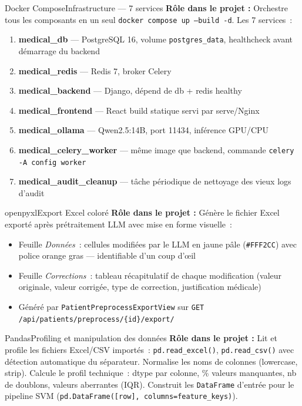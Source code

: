 \documentclass[12pt,a4paper]{article}
\begin{document}
\begin{toolbox}{Docker Compose}{Infrastructure --- 7 services}
\textbf{Rôle dans le projet :} Orchestre tous les composants en un seul
\texttt{docker compose up --build -d}. Les 7 services~:
\begin{enumerate}[leftmargin=2em, itemsep=1pt]
  \item \textbf{medical\_db} --- PostgreSQL 16, volume \texttt{postgres\_data},
    healthcheck avant démarrage du backend
  \item \textbf{medical\_redis} --- Redis 7, broker Celery
  \item \textbf{medical\_backend} --- Django, dépend de db + redis healthy
  \item \textbf{medical\_frontend} --- React build statique servi par serve/Nginx
  \item \textbf{medical\_ollama} --- Qwen2.5:14B, port 11434, inférence GPU/CPU
  \item \textbf{medical\_celery\_worker} --- même image que backend, commande
    \texttt{celery -A config worker}
  \item \textbf{medical\_audit\_cleanup} --- tâche périodique de nettoyage des
    vieux logs d'audit
\end{enumerate}
\end{toolbox}

\begin{toolbox}{openpyxl}{Export Excel coloré}
\textbf{Rôle dans le projet :} Génère le fichier Excel exporté après prétraitement
LLM avec mise en forme visuelle~:
\begin{itemize}[leftmargin=1.5em, itemsep=2pt]
  \item Feuille \textit{Données}~: cellules modifiées par le LLM en jaune pâle
    (\texttt{\#FFF2CC}) avec police orange gras --- identifiable d'un coup d'œil
  \item Feuille \textit{Corrections}~: tableau récapitulatif de chaque modification
    (valeur originale, valeur corrigée, type de correction, justification médicale)
  \item Généré par \texttt{PatientPreprocessExportView} sur
    \texttt{GET /api/patients/preprocess/\{id\}/export/}
\end{itemize}
\end{toolbox}

\begin{toolbox}{Pandas}{Profiling et manipulation des données}
\textbf{Rôle dans le projet :} Lit et profile les fichiers Excel/CSV importés~:
\texttt{pd.read\_excel()}, \texttt{pd.read\_csv()} avec détection automatique
du séparateur. Normalise les noms de colonnes (lowercase, strip). Calcule le
profil technique~: dtype par colonne, \% valeurs manquantes, nb de doublons,
valeurs aberrantes (IQR). Construit les \texttt{DataFrame} d'entrée pour le
pipeline SVM (\texttt{pd.DataFrame([row], columns=feature\_keys)}).
\end{toolbox}
\end{document}
